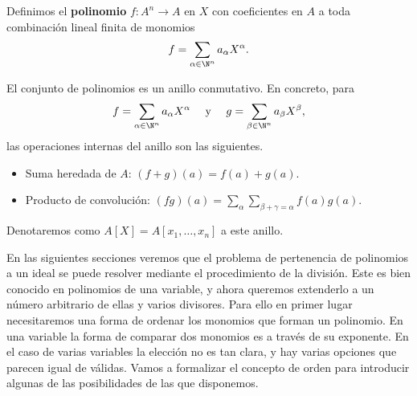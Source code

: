 \begin{definicion}
    Definimos el \textbf{polinomio} $f:A^n\to A$ en $X$ con coeficientes en $A$ a toda combinación lineal finita de monomios
    \begin{align*}
        f = \sum_{\alpha\in \N^n} a_{\alpha} X^{\alpha}.
    \end{align*}

\end{definicion}

\begin{proposicion}
    El conjunto de polinomios es un anillo conmutativo. En concreto, para
     $$ f = \sum_{\alpha\in \N^n} a_{\alpha} X^{\alpha}\quad \text{ y }\quad g = \sum_{\beta\in \N^n} a_{\beta} X^{\beta},$$ 
     las operaciones internas del anillo son las siguientes.
    \begin{itemize}
        \item Suma heredada de $A$: $(f+g)(a) = f(a) + g(a)$.
        \item Producto de convolución: $(fg)(a) = \sum_{\alpha} \sum_{\beta+\gamma=\alpha} f(a)g(a)$.
    \end{itemize}
    Denotaremos como  $A[X] = A[x_1,\dots, x_n]$ a este anillo.
\end{proposicion}

En las siguientes secciones veremos que el problema de pertenencia de polinomios a un ideal se puede resolver mediante el procedimiento de la división. Este es bien conocido en polinomios de una variable, y ahora queremos extenderlo a un número arbitrario de ellas y varios divisores. Para ello en primer lugar necesitaremos una forma de ordenar los monomios que forman un polinomio. En una variable la forma  de comparar dos monomios es a través de su exponente. En el caso de varias variables la elección no es tan clara, y hay varias opciones que parecen igual de válidas. Vamos a formalizar el concepto de orden para introducir algunas de las posibilidades de las que disponemos. 

